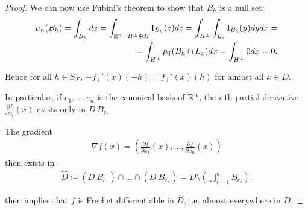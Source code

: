 \begin{proof}
  We can now use Fubini's theorem to show that $B_h$ is a null set:
  \begin{align*}
    \mu_n(B_h)
    =
    \int_{B_h} dz
    =
    \int_{\mathbb R^n = H^\perp \oplus H} \operatorname{I}_{B_h} (z) dz
    =
    \int_{H^\perp} \int_{L_x} \operatorname{I}_{B_h} (y) dy dx
    = \\ =
    \int_{H^\perp} \mu_1(B_h \cap L_x) dx
    =
    \int_{H^\perp} 0 dx
    =
    0.
  \end{align*}

  Hence for all $h \in S_X$, $-f_+'(x)(-h) = f_+'(x)(h)$ for almost all $x \in D$.

  In particular, if $e_1, \ldots, e_n$ is the canonical basis of $\mathbb R^n$, the $i$-th partial derivative $\frac{\partial f} {\partial x_i} (x)$ exists only in $D \ B_{e_i}$.

  The gradient
  \begin{align*}
    \nabla f(x) = \left( \frac{\partial f} {\partial x_1} (x), \ldots, \frac{\partial f} {\partial x_n} (x) \right)
  \end{align*}
  then exists in
  \begin{align*}
    \hat D \coloneqq (D \ B_{e_1}) \cap \ldots \cap (D \ B_{e_n}) = D \setminus \left( \bigcup_{i=1}^n B_{e_i} \right).
  \end{align*}

   then implies that $f$ is Frechet differentiable in $\hat D$, i.e. almost everywhere in $D$.
\end{proof}
